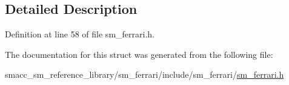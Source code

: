 \subsection{Detailed Description}


Definition at line 58 of file sm\+\_\+ferrari.\+h.



The documentation for this struct was generated from the following file\+:\begin{DoxyCompactItemize}
\item 
smacc\+\_\+sm\+\_\+reference\+\_\+library/sm\+\_\+ferrari/include/sm\+\_\+ferrari/\hyperlink{sm__ferrari_8h}{sm\+\_\+ferrari.\+h}\end{DoxyCompactItemize}
